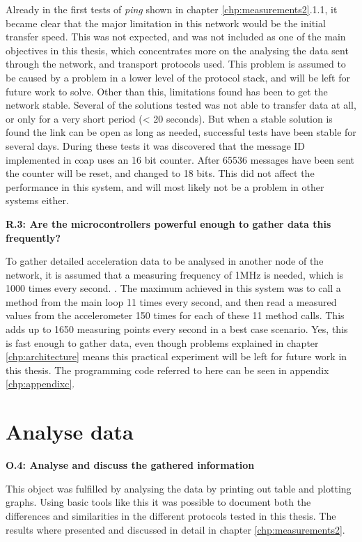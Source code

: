 Already in the first tests of \textit{ping} shown in chapter \ref{chp:measurements2}.1.1, it became clear that the major limitation in this network would be the initial transfer speed. This was not expected, and was not included as one of the main objectives in this thesis, which concentrates more on the analysing the data sent through the network, and transport protocols used. This problem is assumed to be caused by a problem in a lower level of the protocol stack, and will be left for future work to solve. Other than this, limitations found has been to get the network stable. Several of the solutions tested was not able to transfer data at all, or only for a very short period (< 20 seconds). But when a stable solution is found the link can be open as long as needed, successful tests have been stable for several days. During these tests it was discovered that the message ID implemented in \gls{coap} uses an 16 bit counter. After 65536 messages have been sent the counter will be reset, and changed to 18 bits. This did not affect the performance in this system, and will most likely not be a problem in other systems either. 

\noindent\textbf{R.3: Are the microcontrollers powerful enough to gather data this frequently?}

To gather detailed acceleration data to be analysed in another node of the network, it is assumed that a measuring frequency of 1MHz is needed, which is 1000 times every second. . The maximum achieved in this system was to call a method from the main loop 11 times every second, and then read a measured values from the accelerometer 150 times for each of these 11 method calls. This adds up to 1650 measuring points every second in a best case scenario. Yes, this is fast enough to gather data, even though problems explained in chapter \ref{chp:architecture} means this practical experiment will be left for future work in this thesis. The programming code referred to here can be seen in appendix \ref{chp:appendixc}. 


\section{Analyse data}

\noindent\textbf{O.4: Analyse and discuss the gathered information}

This object was fulfilled by analysing the data by printing out table and plotting graphs. Using basic tools like this it was possible to document both the differences and similarities in the different protocols tested in this thesis. The results where presented and discussed in detail in chapter \ref{chp:measurements2}.

